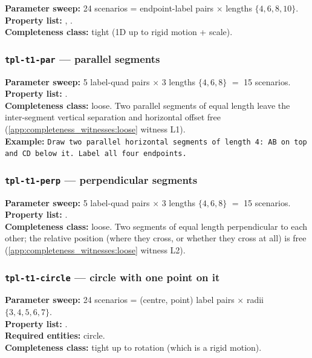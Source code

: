 \textbf{Parameter sweep:} 24 scenarios = endpoint-label pairs $\times$ lengths $\{4, 6, 8, 10\}$.\\
\textbf{Property list:} , .\\
\textbf{Completeness class:} tight (1D up to rigid motion + scale).

\subsubsection{\texttt{tpl-t1-par} --- parallel segments}

\textbf{Parameter sweep:} 5 label-quad pairs $\times$ 3 lengths $\{4, 6, 8\}$ $=$ 15 scenarios.\\
\textbf{Property list:} .\\
\textbf{Completeness class:} loose. Two parallel segments of equal length leave the inter-segment vertical separation and horizontal offset free (\cref{app:completeness_witnesses:loose} witness L1).\\
\textbf{Example:} \texttt{Draw two parallel horizontal segments of length 4: AB on top and CD below it. Label all four endpoints.}

\subsubsection{\texttt{tpl-t1-perp} --- perpendicular segments}

\textbf{Parameter sweep:} 5 label-quad pairs $\times$ 3 lengths $\{4, 6, 8\}$ $=$ 15 scenarios.\\
\textbf{Property list:} .\\
\textbf{Completeness class:} loose. Two segments of equal length perpendicular to each other; the relative position (where they cross, or whether they cross at all) is free (\cref{app:completeness_witnesses:loose} witness L2).

\subsubsection{\texttt{tpl-t1-circle} --- circle with one point on it}

\textbf{Parameter sweep:} 24 scenarios = (centre, point) label pairs $\times$ radii $\{3, 4, 5, 6, 7\}$.\\
\textbf{Property list:} .\\
\textbf{Required entities:} circle.\\
\textbf{Completeness class:} tight up to rotation (which is a rigid motion).

